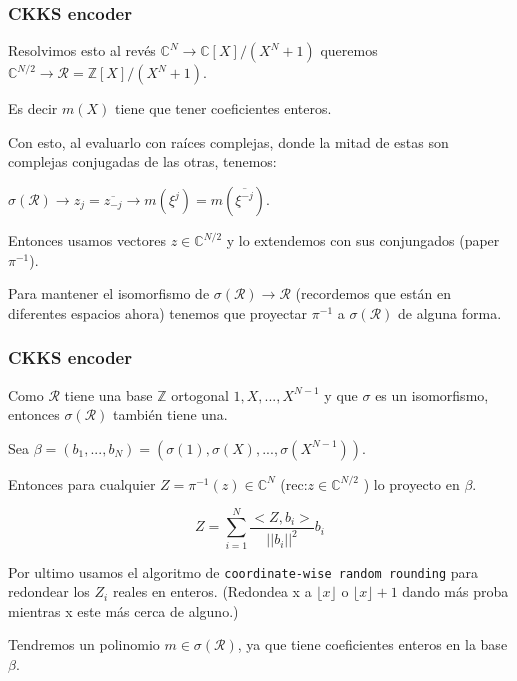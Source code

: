 \documentclass[10pt]{beamer}
\newcommand{\floor}[1]{\lfloor #1 \rfloor}
\begin{document}
\begin{frame}
\frametitle{CKKS encoder}

Resolvimos  esto al revés $ \mathbb{C}^N \to \mathbb{C}[X]/(X^N+1)$ queremos
$ \mathbb{C}^{N/2} \to \mathcal{R} =\mathbb{Z}[X]/(X^N+1)$.

Es decir $m(X)$ tiene que tener coeficientes enteros.

\pause
Con esto, al evaluarlo con raíces complejas, donde la mitad de estas son complejas
conjugadas de las otras, tenemos:

$\sigma(\mathcal{R}) \to z_j=\overline{z_{-j}} \to m(\xi^j)=m(\overline{\xi^{-j}})$.

\pause
Entonces usamos vectores $z\in\mathbb{C}^{N/2}$ y lo extendemos con sus conjungados (paper $\pi^{-1}$).

\pause
Para mantener el isomorfismo de $\sigma(\mathcal{R})\to \mathcal{R}$ (recordemos que están
en diferentes espacios ahora) tenemos que proyectar $\pi^{-1}$ a $\sigma(\mathcal{R})$ de
alguna forma.
\end{frame}

\begin{frame}
\frametitle{CKKS encoder}

Como $\mathcal{R}$ tiene una base $\mathbb{Z}$ ortogonal $1, X,...,X^{N-1}$ y que $\sigma$ es
un isomorfismo, entonces $\sigma(\mathcal{R})$ también tiene una.

Sea $\beta = (b_1,...,b_N)=(\sigma(1),\sigma(X),...,\sigma(X^{N-1}))$.

\pause
Entonces para cualquier $Z=\pi^{-1}(z)\in \mathbb{C}^N$ (rec:$z\in\mathbb{C}^{N/2}$ )
lo proyecto en $\beta$.

\begin{equation*}
Z=\sum_{i=1}^N\frac{<Z,b_i>}{|| b_i||^2}b_i
\end{equation*}

\pause

Por ultimo usamos el algoritmo de \texttt{coordinate-wise random rounding} para
redondear los $Z_i$ reales en enteros.
(Redondea x a $\floor{x}$ o $\floor{x}+1$ dando más proba mientras x este más cerca de alguno.)


Tendremos un polinomio $m\in \sigma(\mathcal{R})$, ya que tiene coeficientes enteros en la base $\beta$.

\end{frame}
\end{document}

